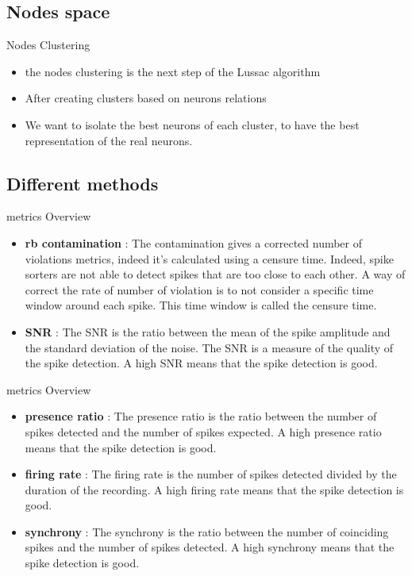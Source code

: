 \documentclass[numbering=fraction]{beamer}
\begin{document}
\subsection{Nodes space}
\begin{frame}{Nodes Clustering}
    \begin{itemize}
        \item the nodes clustering is the next step of the Lussac algorithm
        \item After creating clusters based on neurons relations
        \item We want to isolate the best neurons of each cluster, to have the best representation of the real neurons.
    \end{itemize}
\end{frame}
\subsection{Different methods}
\begin{frame}{metrics Overview}
    \begin{itemize}
        \item \textbf{rb contamination} : The contamination gives a corrected number of violations metrics, indeed it's calculated using a censure time. Indeed, spike sorters are not able to detect spikes that are too close to each other. A way of correct the rate of number of violation is to not consider a specific time window around each spike. This time window is called the censure time.
        \item \textbf{SNR} : The SNR is the ratio between the mean of the spike amplitude and the standard deviation of the noise. The SNR is a measure of the quality of the spike detection. A high SNR means that the spike detection is good.

    \end{itemize}
\end{frame}

\begin{frame}{metrics Overview}
    \begin{itemize}

        \item \textbf{presence ratio} : The presence ratio is the ratio between the number of spikes detected and the number of spikes expected. A high presence ratio means that the spike detection is good.
        \item \textbf{firing rate} : The firing rate is the number of spikes detected divided by the duration of the recording. A high firing rate means that the spike detection is good.
        \item \textbf{synchrony} : The synchrony is the ratio between the number of coinciding spikes and the number of spikes detected. A high synchrony means that the spike detection is good.

    \end{itemize}
\end{frame}
\end{document}
